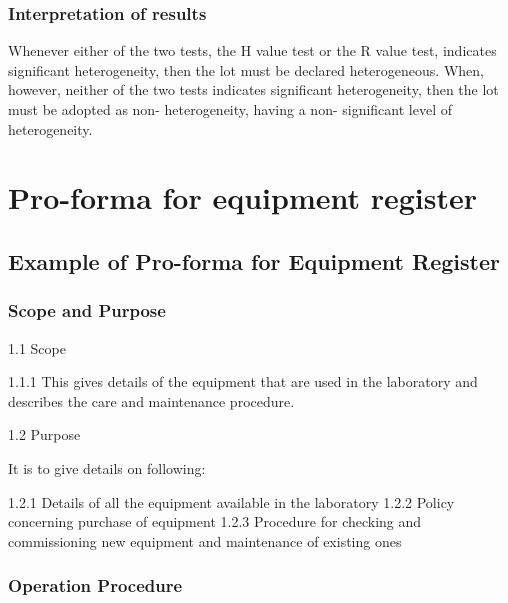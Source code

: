 \documentclass[]{book}
\begin{document}
\subsection{Interpretation of results}\label{interpretation-of-results}

Whenever either of the two tests, the H value test or the R value test,
indicates significant heterogeneity, then the lot must be declared
heterogeneous. When, however, neither of the two tests indicates
significant heterogeneity, then the lot must be adopted as non-
heterogeneity, having a non- significant level of heterogeneity.

\chapter{Pro-forma for equipment
register}\label{pro-forma-for-equipment-register}

\section{Example of Pro-forma for Equipment
Register}\label{example-of-pro-forma-for-equipment-register}

\subsection{Scope and Purpose}\label{scope-and-purpose-1}

1.1 Scope

1.1.1 This gives details of the equipment that are used in the
laboratory and describes the care and maintenance procedure.

1.2 Purpose

It is to give details on following:

1.2.1 Details of all the equipment available in the laboratory 1.2.2
Policy concerning purchase of equipment 1.2.3 Procedure for checking and
commissioning new equipment and maintenance of existing ones

\subsection{Operation Procedure}\label{operation-procedure}
\end{document}
